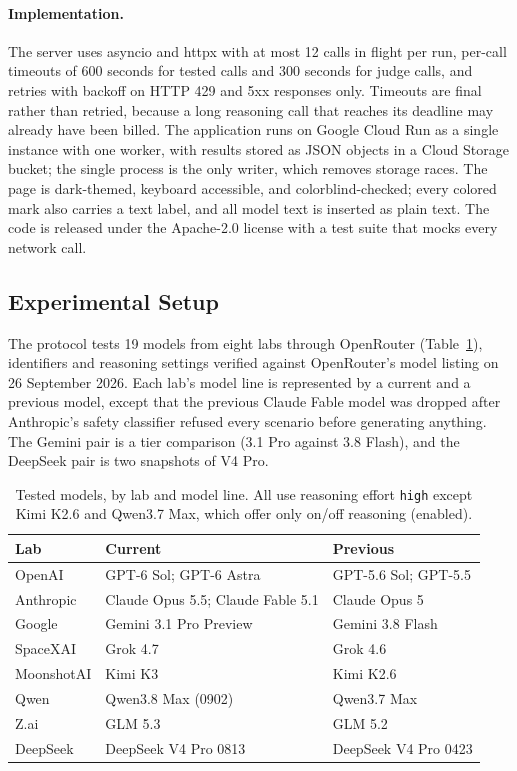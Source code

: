 \documentclass[12pt]{article}
\begin{document}
\paragraph{Implementation.} The server uses asyncio and httpx with at most 12 calls in flight per run, per-call timeouts of 600 seconds for tested calls and 300 seconds for judge calls, and retries with backoff on HTTP 429 and 5xx responses only. Timeouts are final rather than retried, because a long reasoning call that reaches its deadline may already have been billed. The application runs on Google Cloud Run as a single instance with one worker, with results stored as JSON objects in a Cloud Storage bucket; the single process is the only writer, which removes storage races. The page is dark-themed, keyboard accessible, and colorblind-checked; every colored mark also carries a text label, and all model text is inserted as plain text. The code is released under the Apache-2.0 license with a test suite that mocks every network call.

\subsection*{Experimental Setup}

The protocol tests 19 models from eight labs through OpenRouter (Table~\ref{tab:models}), identifiers and reasoning settings verified against OpenRouter's model listing on 26 September 2026. Each lab's model line is represented by a current and a previous model, except that the previous Claude Fable model was dropped after Anthropic's safety classifier refused every scenario before generating anything. The Gemini pair is a tier comparison (3.1 Pro against 3.8 Flash), and the DeepSeek pair is two snapshots of V4 Pro.

\begin{table}[htbp]
\centering
\caption{Tested models, by lab and model line. All use reasoning effort \texttt{high} except Kimi K2.6 and Qwen3.7 Max, which offer only on/off reasoning (enabled).}
\label{tab:models}
\small
\begin{tabular}{@{}lll@{}}
\toprule
\textbf{Lab} & \textbf{Current} & \textbf{Previous} \\ \midrule
OpenAI & GPT-6 Sol; GPT-6 Astra & GPT-5.6 Sol; GPT-5.5 \\
Anthropic & Claude Opus 5.5; Claude Fable 5.1 & Claude Opus 5 \\
Google & Gemini 3.1 Pro Preview & Gemini 3.8 Flash \\
SpaceXAI & Grok 4.7 & Grok 4.6 \\
MoonshotAI & Kimi K3 & Kimi K2.6 \\
Qwen & Qwen3.8 Max (0902) & Qwen3.7 Max \\
Z.ai & GLM 5.3 & GLM 5.2 \\
DeepSeek & DeepSeek V4 Pro 0813 & DeepSeek V4 Pro 0423 \\ \bottomrule
\end{tabular}
\end{table}
\end{document}
